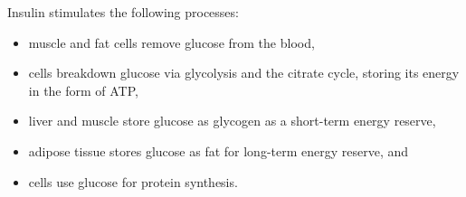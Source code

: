













Insulin stimulates the following processes:

\begin{itemize}
\item muscle and fat cells remove glucose from the blood,
\item cells breakdown glucose via glycolysis and the citrate cycle, storing its energy in the form of ATP,
\item liver and muscle store glucose as glycogen as a short-term energy reserve,
\item adipose tissue stores glucose as fat for long-term energy reserve, and
\item cells use glucose for protein synthesis.
\end{itemize}

